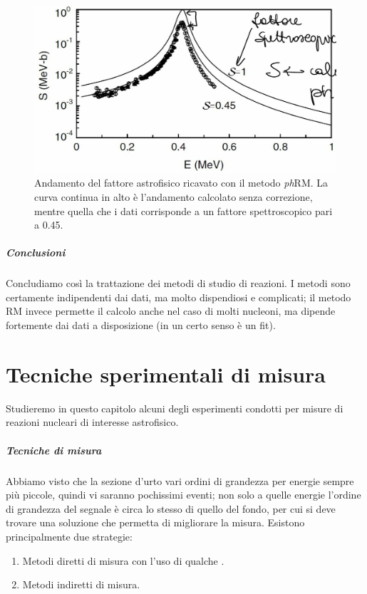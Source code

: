 \begin{figure}[h]
	\centering
	\includegraphics[scale=0.3]{Immagini/0414_RM2.png}
	\caption{Andamento del fattore astrofisico ricavato con il metodo \textit{ph}RM. La curva continua in alto è l'andamento calcolato senza correzione, mentre quella che  i dati corrisponde a un fattore spettroscopico pari a 0.45.}
	\label{0414_phRM2}
\end{figure}
\newpage
\paragraph{Conclusioni} Concludiamo così la trattazione dei metodi di studio di reazioni. I metodi  sono certamente indipendenti dai dati, ma molto dispendiosi e complicati; il metodo RM invece permette il calcolo anche nel caso di molti nucleoni, ma dipende fortemente dai dati a disposizione (in un certo senso è un fit). 


\chapter{Tecniche sperimentali di misura}
Studieremo in questo capitolo alcuni degli esperimenti condotti per misure di reazioni nucleari di interesse astrofisico.
\paragraph{Tecniche di misura} 
Abbiamo visto che la sezione d'urto  vari ordini di grandezza per energie sempre più piccole, quindi vi saranno pochissimi eventi; non solo a quelle energie l'ordine di grandezza del segnale è circa lo stesso di quello del fondo, per cui si deve trovare una soluzione che permetta di migliorare la misura. Esistono principalmente due strategie:
\begin{enumerate}
	\item Metodi diretti di misura con l'uso di qualche .
	\item Metodi indiretti di misura.
\end{enumerate}

